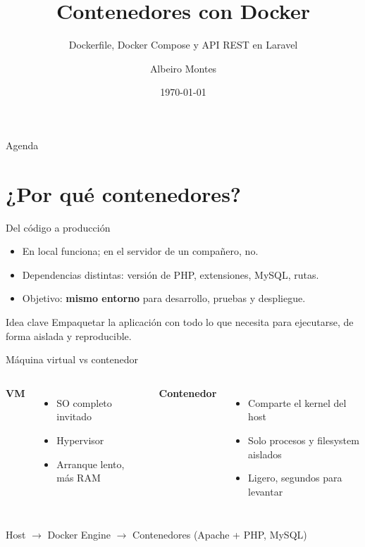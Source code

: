 \documentclass[aspectratio=169,10pt]{beamer}
\title{Contenedores con Docker}
\subtitle{Dockerfile, Docker Compose y API REST en Laravel}
\author{Albeiro Montes}
\institute{Ingeniería de Software II / Proyecto CRUD Laravel}
\date{\today}
\begin{document}
\begin{frame}
  \titlepage
\end{frame}

\begin{frame}{Agenda}
  \tableofcontents
\end{frame}

\section{¿Por qué contenedores?}

\begin{frame}{Del código a producción}
  \begin{itemize}
    \item En local funciona; en el servidor de un compañero, no.
    \item Dependencias distintas: versión de PHP, extensiones, MySQL, rutas.
    \item Objetivo: \textbf{mismo entorno} para desarrollo, pruebas y despliegue.
  \end{itemize}
  \vspace{0.5em}
  \begin{block}{Idea clave}
    Empaquetar la aplicación con todo lo que necesita para ejecutarse, de forma aislada y reproducible.
  \end{block}
\end{frame}

\begin{frame}{Máquina virtual vs contenedor}
  \begin{columns}[T]
    \textbf{VM}
    \begin{itemize}
      \item SO completo invitado
      \item Hypervisor
      \item Arranque lento, más RAM
    \end{itemize}
    \textbf{Contenedor}
    \begin{itemize}
      \item Comparte el kernel del host
      \item Solo procesos y filesystem aislados
      \item Ligero, segundos para levantar
    \end{itemize}
  \end{columns}
  \vspace{0.8em}
  \centering
  \small Host $\rightarrow$ Docker Engine $\rightarrow$ Contenedores (Apache + PHP, MySQL)
\end{frame}
\end{document}
